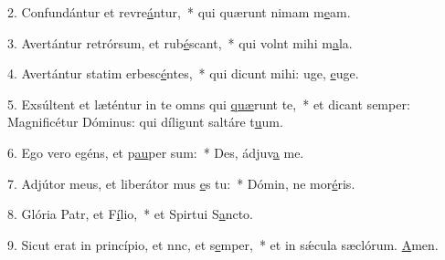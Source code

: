 2. Confundántur et revre\uline{á}ntur,~* qui quærunt nimam m\uline{e}am.\par 
3. Avertántur retrórsum, et rub\uline{é}scant,~* qui volnt mihi m\uline{a}la.\par 
4. Avertántur statim erbesc\uline{é}ntes,~* qui dicunt mihi: uge, \uline{e}uge.\par 
5. Exsúltent et læténtur in te omns qui \uline{quæ}runt te,~* et dicant semper: Magnificétur Dóminus: qui díligunt saltáre t\uline{u}um.\par 
6. Ego vero egéns, et p\uline{au}per sum:~* Des, ádjuv\uline{a} me.\par 
7. Adjútor meus, et liberátor mus \uline{e}s tu:~* Dómin, ne mor\uline{é}ris.\par 
8. Glória Patr, et F\uline{í}lio,~* et Spirtui S\uline{a}ncto.\par 
9. Sicut erat in princípio, et nnc, et s\uline{e}mper,~* et in sǽcula sæclórum. \uline{A}men.\par 
